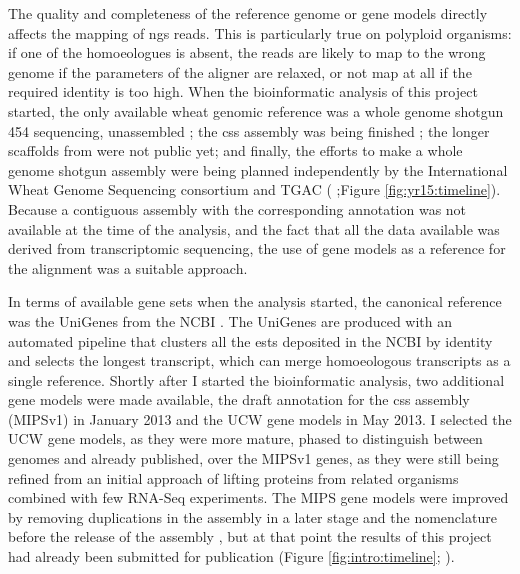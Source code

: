 The quality and completeness  of the reference genome or gene models directly affects the mapping of \gls{ngs} reads. 
This is particularly true on polyploid organisms: if one of the homoeologues is absent, the reads are likely to map to the wrong genome if the parameters of the aligner are relaxed, or not map at all if the required identity is too high.
When the bioinformatic analysis of this project started, the only available wheat genomic reference was a whole genome shotgun 454 sequencing, unassembled \citep{Brenchley2012}; the \gls{css} assembly was being finished \citep{Mayer2014}; the longer scaffolds from \citet{Chapman2015} were not public yet; and finally, the efforts to make a whole genome shotgun assembly were being planned independently by the International Wheat Genome Sequencing consortium  \citep{Pozniak2016} and TGAC (\citealt{Clark2016} ;Figure \ref{fig:yr15:timeline}).  
Because a contiguous assembly with the corresponding annotation was not available at the time of the analysis, and the fact that all the data available was derived from transcriptomic sequencing, the use of gene models as a reference for the alignment was a suitable approach. 

In terms of available gene sets when the analysis started, the canonical reference was the UniGenes from the NCBI \citep{PontiusJUWagnerL2002}. 
The UniGenes are produced with an automated pipeline that clusters all the \glspl{est} deposited in the NCBI by identity and selects the longest transcript, which can merge homoeologous transcripts as a single reference.
Shortly after I started the bioinformatic analysis, two additional gene models were made available, the draft annotation for the \gls{css} assembly (MIPSv1) in January 2013 and the UCW gene models \citep{Krasileva2013} in May 2013. 
I selected the UCW gene models, as they were more mature, phased to distinguish between genomes and already published, over the MIPSv1 genes, as they were still being refined from an initial approach of lifting proteins from related organisms combined with few RNA-Seq experiments.  
The MIPS gene models were improved by removing duplications in the assembly in a later stage and the nomenclature before the release of the assembly \citep{Mayer2014}, but at that point the results of this project had already been submitted for publication (Figure \ref{fig:intro:timeline}; \citealt{Ramirez-Gonzalez2015b}). 
 

